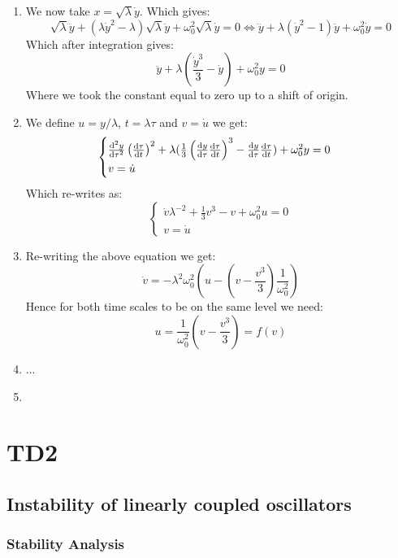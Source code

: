\documentclass[10pt,a4paper]{book}
\begin{document}
\begin{enumerate}
\item We now take $x = \sqrt{\lambda} \dot{y}$. Which gives:
\[
\sqrt{\lambda} \dddot{y} + (\lambda \dot{y}^2 - \lambda) \sqrt{\lambda} \ddot{y} + \omega_0^2 \sqrt{\lambda} \dot{y} = 0 \Leftrightarrow \dddot{y} +\lambda(\dot{y}^2 - 1) \ddot{y} + \omega_0^2 \dot{y} = 0
\]
Which after integration gives:
\[
\ddot{y} + \lambda \left( \frac{\dot{y}^3}{3} - \dot{y} \right) + \omega_0^2 y = 0
\]
Where we took the constant equal to zero up to a shift of origin.

\item We define $u = y/\lambda$, $t = \lambda \tau$ and $v = \dot{u}$ we get:
\[
\begin{cases}
\dv[2]{y}{\tau} \left(\dv{\tau}{t}\right)^2 + \lambda(\frac{1}{3} \left( \dv{y}{\tau} \dv{\tau}{t} \right)^3 - \dv{y}{\tau}\dv{\tau}{t}) + \omega_0^2 y = 0   \\
v = \dot{u}
\end{cases}
\]
Which re-writes as:
\[
\begin{cases}
\dot{v} \lambda^{-2}  + \frac{1}{3} v^3 - v + \omega_0^2 u = 0\\
v = \dot{u}
\end{cases}
\]

\item Re-writing the above equation we get:
\[
\dot{v} = -\lambda^2 \omega_0^2 (u - (v - \frac{v^3}{3})\frac{1}{\omega_0^2})
\]
Hence for both time scales to be on the same level we need:
\[
u = \frac{1}{\omega_0^2}\left(v - \frac{v^3}{3}\right) = f(v)
\]

\item ...


\item 


\end{enumerate}

\chapter{TD2}
\section{Instability of linearly coupled oscillators}

\subsection{Stability Analysis}
\end{document}
